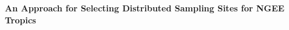 \begin{frame}
 \begin{center}
  \vbox{\Huge\color{CCSIGreen}\textbf{An Approach for Selecting Distributed Sampling Sites for NGEE Tropics}}
 \end{center}
\end{frame}


